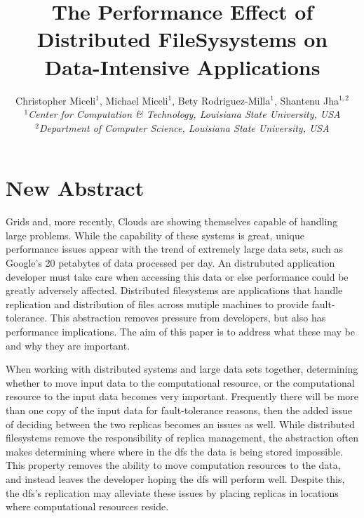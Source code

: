 \documentclass[a4paper,11pt]{article}
\begin{document}
\title{\large The Performance Effect of Distributed FileSysystems on Data-Intensive Applications}

\author{Christopher Miceli$^{1}$, Michael Miceli$^{1}$, Bety Rodriguez-Milla$^{1}$, Shantenu Jha$^{1,2}$\\
  \small{\emph{$^{1}$Center for Computation \& Technology, Louisiana State University, USA}}\\
  \small{\emph{$^{2}$Department of Computer Science, Louisiana State
      University, USA}}}

\maketitle

\section{New Abstract}

Grids and, more recently, Clouds are showing themselves capable of handling large problems. While the capability of these systems is great, unique performance issues appear with the trend of extremely large data sets, such as Google's 20 petabytes of data processed per day.  An distrubuted application developer must take care when accessing this data or else performance could be greatly adversely affected. Distributed filesystems are applications that handle replication and distribution of files across mutiple machines to provide fault-tolerance. This abstraction removes pressure from developers, but also has performance implications.  The aim of this paper is to address what these may be and why they are important.

When working with distributed systems and large data sets together, determining whether to move input data to the computational resource, or the computational resource to the input data becomes very important. Frequently there will be more than one copy of the input data for fault-tolerance reasons, then the added issue of deciding between the two replicas becomes an issues as well. While distributed filesystems remove the responsibility of replica management, the abstraction often makes determining where where in the dfs the data is being stored impossible.  This property removes the ability to move computation resources to the data, and instead leaves the developer hoping the dfs will perform well. Despite this, the dfs's replication may alleviate these issues by placing replicas in locations where computational resources reside.
\end{document}
